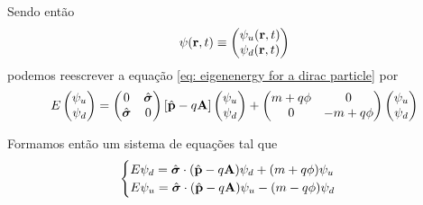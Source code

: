 \begin{example}
        Sendo então
            \begin{equation*}
                \psi(\vb{r},t) \equiv \begin{pmatrix}
                    \psi_{u}(\vb{r},t) \\ \psi_{d}(\vb{r},t)
                \end{pmatrix}
            \end{equation*}
        podemos reescrever a equação \eqref{eq: eigenenergy for a dirac particle} por
            \begin{equation*}
                E \begin{pmatrix}
                    \psi_{u} \\ \psi_{d}
                \end{pmatrix} = \begin{pmatrix}
                    0 & \hat{\boldsymbol{\sigma}} \\
                    \hat{\boldsymbol{\sigma}} & 0
                \end{pmatrix}[\hat{\vb{p}} - q\vb{A}]
                \begin{pmatrix}
                    \psi_{u} \\ \psi_{d}
                \end{pmatrix} + 
                \begin{pmatrix}
                    m+q\phi & 0 \\
                    0 & -m+q\phi
                \end{pmatrix}
                \begin{pmatrix}
                    \psi_{u} \\
                    \psi_{d}
                \end{pmatrix}
            \end{equation*}

        Formamos então um sistema de equações tal que
            \begin{equation*}
                \begin{cases}
                    E\psi_{d} = \hat{\boldsymbol{\sigma}}\cdot(\hat{\vb{p}} - q\vb{A})\psi_{d} + (m + q\phi)\psi_{u} \\
                    E\psi_{u} = \hat{\boldsymbol{\sigma}}\cdot (\hat{\vb{p}} - q\vb{A})\psi_{u} - (m - q\phi)\psi_{d}
                \end{cases}
            \end{equation*}


\end{example}
